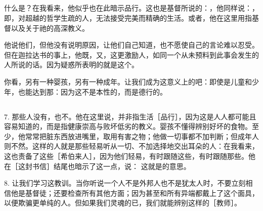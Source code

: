 \subsection{}

 什么是？在我看来，他似乎也在此暗示品行。这也是基督所说的：，他同样说：，即，对超越的哲学生疏的人，无法接受完美而精确的生活。或者，他在这里用指基督以及关于祂的高深教义。\par

他说他们，但他没有说明原因，让他们自己知道，也不愿使自己的言论难以忍受。但在迦拉达书的事上，他既，又，这更激励人，如同一个从未预料到此事会发生的人所说的话。因为疑惑所表明的就是这个。\par

你看，另有一种婴孩，另有一种成年。让我们成为这意义上的吧：即使是儿童和少年，也能达到那：因为这不是本性的，而是德行的。\par


\subsection{}

7.  那些人没有，也不。他在这里说，并非指生活［品行］，因为这是人人都可能且容易知道的，而是指健康崇高与败坏低劣的教义。婴孩不懂得辨别好坏的食物。至少，他常常把脏东西放进嘴里，取用有害之物；他做一切事都不加判断；但成年人则不然。这样的人就是那些轻易听从一切、不加选择地交出耳朵的人：在我看来，这也责备了这些［希伯来人］，因为他们轻易，有时跟随这些，有时跟随那些。他在［这封书信］结尾也暗示了这一点，说： 这就是的意思。\par

8. 让我们学习这教训。当你听说一个人不是外邦人也不是犹太人时，不要立刻相信他是基督徒；还要检查所有其他方面；因为甚至和所有异端都戴上了这个面具，以便欺骗更单纯的人。但如果我们灵魂的已，我们就能辨别这样的［教师］。\par


